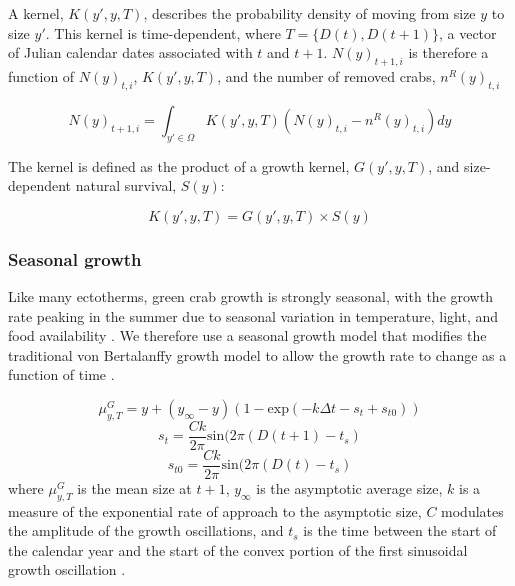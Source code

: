 \documentclass{article}
\begin{document}
A kernel, $K(y', y, T)$, describes the probability density of moving from size $y$ to size $y'$. This kernel is time-dependent, where $T = \{D(t), D(t+1)\}$, a vector of Julian calendar dates associated with $t$ and $t+1$. $N(y)_{t+1,i}$ is therefore a function of $N(y)_{t,i}$, $K(y', y, T)$, and the number of removed crabs, $n^R(y)_{t,i}$

\begin{equation}
N(y)_{t+1,i} = \int_{y' \in \Omega} K(y',y, T) (N(y)_{t,i} - n^R(y)_{t,i}) dy
\end{equation}

The kernel is defined as the product of a growth kernel, $G(y',y, T)$, and size-dependent natural survival, $S(y)$:

\begin{equation}
K(y',y, T) = G(y',y, T) \times S(y)
\end{equation}

\subsubsection*{Seasonal growth}

Like many ectotherms, green crab growth is strongly seasonal, with the growth rate peaking in the summer due to seasonal variation in temperature, light, and food availability \parencite{contreras2003population, garcia2012technical}. We therefore use a seasonal growth model that modifies the traditional von Bertalanffy growth model to allow the growth rate to change as a function of time \parencite{beverton2012dynamics, somers1988seasonally}.

\begin{equation}
\mu^G_{y,T} = y + (y_{\infty}-y)(1-\text{exp}(-k\Delta t-s_t+s_{t0}))
\end{equation}
\begin{equation}
s_t = \frac{Ck}{2\pi} \text{sin}(2\pi(D(t+1)-t_s)
\end{equation}
\begin{equation}
s_{t0} = \frac{Ck}{2\pi} \text{sin}(2\pi(D(t)-t_s)
\end{equation}
where $\mu^G_{y,T}$ is the mean size at $t+1$, $y_{\infty}$ is the asymptotic average size, $k$ is a measure of the exponential rate of approach to the asymptotic size, $C$ modulates the amplitude of the growth oscillations, and $t_s$ is the time between the start of the calendar year and the start of the convex portion of the first sinusoidal growth oscillation \parencite{garcia2012technical}.
\end{document}
